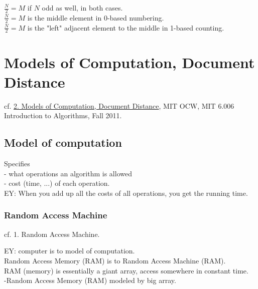 \documentclass[10pt]{amsart}
\begin{document}
\begin{multicols*}{2}
$\frac{N}{2} = M$ if $N$ odd as well, in both cases. \\
$\frac{N}{2} = M$ is the middle element in 0-based numbering. \\
$\frac{N}{2} = M$ is the "left" adjacent element to the middle in 1-based counting.

\section{Models of Computation, Document Distance}

cf. \href{https://youtu.be/Zc54gFhdpLA}{2. Models of Computation, Document Distance}, MIT OCW, MIT 6.006 Introduction to Algorithms, Fall 2011.

\subsection{Model of computation}

Specifies \\
- what operations an algorithm is allowed \\
- cost (time, ...) of each operation. \\
EY: When you add up all the costs of all operations, you get the running time.

\subsubsection{Random Access Machine}

cf. 1. Random Access Machine.

EY: computer is to model of computation. \\
Random Access Memory (RAM) is to Random Access Machine (RAM). \\
RAM (memory) is essentially a giant array, access somewhere in constant time. \\
-Random Access Memory (RAM) modeled by big array.  


\end{multicols*}
\end{document}
